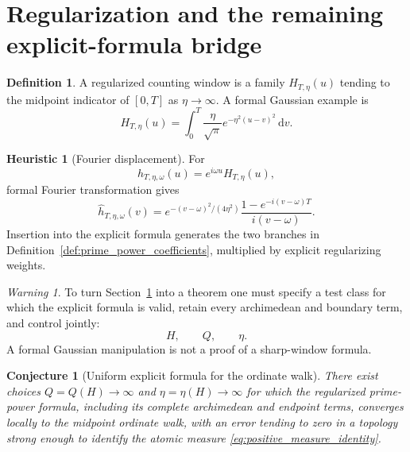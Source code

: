 \documentclass[11pt]{amsart}
\numberwithin{equation}{section}
\theoremstyle{plain}
\newtheorem{conjecture}[theorem]{Conjecture}
\theoremstyle{definition}
\newtheorem{definition}[theorem]{Definition}
\newtheorem{heuristic}[theorem]{Heuristic}
\theoremstyle{remark}
\newtheorem{warning}[theorem]{Warning}
\newcommand{\1}{\mathbf{1}}
\newcommand{\dd}{\,\mathrm{d}}
\begin{document}
\section{Regularization and the remaining explicit-formula bridge}
\label{sec:regularization_bridge}

\begin{definition}
\label{def:regularized_window}
A regularized counting window is a family
\(H_{T,\eta}(u)\) tending to the midpoint indicator of \([0,T]\) as
\(\eta\to\infty\).  A formal Gaussian example is
\begin{equation}
H_{T,\eta}(u)
=
\int_0^T
\frac{\eta}{\sqrt\pi}
e^{-\eta^2(u-v)^2}\dd v.
\label{eq:gaussian_window}
\end{equation}
\end{definition}

\begin{heuristic}[Fourier displacement]
\label{heur:gaussian_fourier}
For
\begin{equation}
h_{T,\eta,\omega}(u)
=
e^{i\omega u}H_{T,\eta}(u),
\label{eq:gaussian_test}
\end{equation}
formal Fourier transformation gives
\begin{equation}
\widehat h_{T,\eta,\omega}(v)
=
e^{-(v-\omega)^2/(4\eta^2)}
\frac{1-e^{-i(v-\omega)T}}{i(v-\omega)}.
\label{eq:gaussian_fourier}
\end{equation}
Insertion into the explicit formula generates the two branches in
Definition~\ref{def:prime_power_coefficients}, multiplied by explicit
regularizing weights.
\end{heuristic}

\begin{warning}
\label{warn:regularization_requirements}
To turn Section~\ref{sec:regularization_bridge} into a theorem one must
specify a test class for which the explicit formula is valid, retain every
archimedean and boundary term, and control jointly:
\begin{equation}
H,\qquad Q,\qquad\eta.
\label{eq:joint_parameters}
\end{equation}
A formal Gaussian manipulation is not a proof of a sharp-window formula.
\end{warning}

\begin{conjecture}[Uniform explicit formula for the ordinate walk]
\label{conj:uniform_explicit_formula}
There exist choices \(Q=Q(H)\to\infty\) and
\(\eta=\eta(H)\to\infty\) for which the regularized prime-power formula,
including its complete archimedean and endpoint terms, converges locally
to the midpoint ordinate walk, with an error tending to zero in a
topology strong enough to identify the atomic measure
\eqref{eq:positive_measure_identity}.
\end{conjecture}
\end{document}
